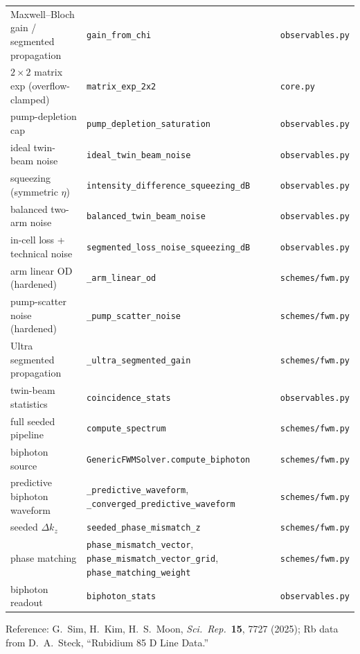 \documentclass[11pt]{article}
\newcommand{\code}[1]{\texttt{#1}}
\begin{document}
\begin{center}
\begin{tabular}{lll}
Maxwell--Bloch gain / segmented propagation & \code{gain\_from\_chi} & \code{observables.py} \\
$2\times2$ matrix exp (overflow-clamped) & \code{matrix\_exp\_2x2} & \code{core.py} \\
pump-depletion cap & \code{pump\_depletion\_saturation} & \code{observables.py} \\
ideal twin-beam noise & \code{ideal\_twin\_beam\_noise} & \code{observables.py} \\
squeezing (symmetric $\eta$) & \code{intensity\_difference\_squeezing\_dB} & \code{observables.py} \\
balanced two-arm noise & \code{balanced\_twin\_beam\_noise} & \code{observables.py} \\
in-cell loss + technical noise & \code{segmented\_loss\_noise\_squeezing\_dB} & \code{observables.py} \\
arm linear OD (hardened) & \code{\_arm\_linear\_od} & \code{schemes/fwm.py} \\
pump-scatter noise (hardened) & \code{\_pump\_scatter\_noise} & \code{schemes/fwm.py} \\
Ultra segmented propagation & \code{\_ultra\_segmented\_gain} & \code{schemes/fwm.py} \\
twin-beam statistics & \code{coincidence\_stats} & \code{observables.py} \\
full seeded pipeline & \code{compute\_spectrum} & \code{schemes/fwm.py} \\
biphoton source & \code{GenericFWMSolver.compute\_biphoton} & \code{schemes/fwm.py} \\
predictive biphoton waveform & \code{\_predictive\_waveform}, \code{\_converged\_predictive\_waveform} & \code{schemes/fwm.py} \\
seeded $\Delta k_z$ & \code{seeded\_phase\_mismatch\_z} & \code{schemes/fwm.py} \\
phase matching & \code{phase\_mismatch\_vector}, \code{phase\_mismatch\_vector\_grid}, \code{phase\_matching\_weight} & \code{schemes/fwm.py} \\
biphoton readout & \code{biphoton\_stats} & \code{observables.py} \\
\bottomrule
\end{tabular}
\end{center}

\vfill
\begin{center}\small
Reference: G.\ Sim, H.\ Kim, H.\ S.\ Moon, \emph{Sci.\ Rep.}\ \textbf{15}, 7727 (2025);
Rb data from D.\ A.\ Steck, ``Rubidium 85 D Line Data.''
\end{center}
\end{document}
